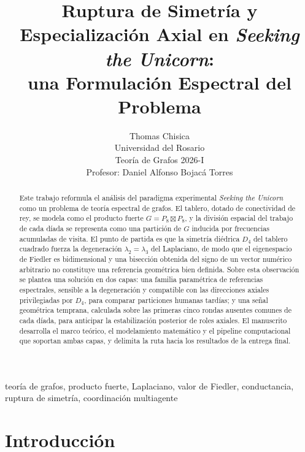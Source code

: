 \documentclass[journal]{IEEEtran}
\begin{document}
\title{Ruptura de Simetría y Especialización Axial en \emph{Seeking the Unicorn}:\\ una Formulación Espectral del Problema}

\author{Thomas Chisica\\
Universidad del Rosario\\
Teoría de Grafos 2026-I\\
Profesor: Daniel Alfonso Bojacá Torres}

\maketitle

\begin{abstract}
Este trabajo reformula el análisis del paradigma experimental \emph{Seeking the Unicorn} como un problema de teoría espectral de grafos. El tablero, dotado de conectividad de rey, se modela como el producto fuerte $G = P_8 \boxtimes P_8$, y la división espacial del trabajo de cada díada se representa como una partición de $G$ inducida por frecuencias acumuladas de visita. El punto de partida es que la simetría diédrica $D_4$ del tablero cuadrado fuerza la degeneración $\lambda_2 = \lambda_3$ del Laplaciano, de modo que el eigenespacio de Fiedler es bidimensional y una bisección obtenida del signo de un vector numérico arbitrario no constituye una referencia geométrica bien definida. Sobre esta observación se plantea una solución en dos capas: una familia paramétrica de referencias espectrales, sensible a la degeneración y compatible con las direcciones axiales privilegiadas por $D_4$, para comparar particiones humanas tardías; y una señal geométrica temprana, calculada sobre las primeras cinco rondas ausentes comunes de cada díada, para anticipar la estabilización posterior de roles axiales. El manuscrito desarrolla el marco teórico, el modelamiento matemático y el pipeline computacional que soportan ambas capas, y delimita la ruta hacia los resultados de la entrega final.
\end{abstract}

\begin{IEEEkeywords}
teoría de grafos, producto fuerte, Laplaciano, valor de Fiedler, conductancia, ruptura de simetría, coordinación multiagente
\end{IEEEkeywords}

\section{Introducción}
\end{document}
